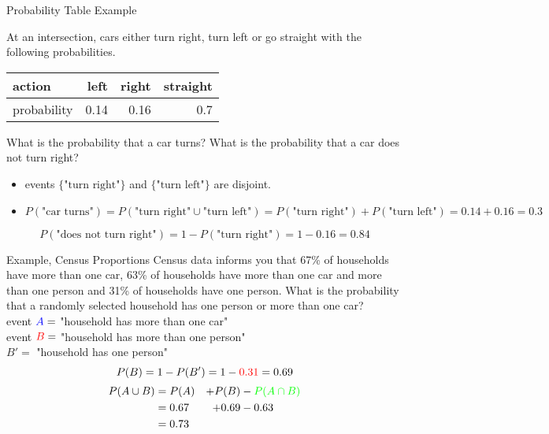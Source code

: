 \documentclass{beamer}
\newcommand{\blue}[1]{{\color{blue} #1}}
\newcommand{\red}[1]{{\color{red} #1}}
\newcommand{\grn}[1]{{\color{green} #1}}
\newcommand{\nl}[1]{\vspace{#1 em}}
\begin{document}
    \begin{frame}{Probability Table Example}
        
        At an intersection, cars either turn right, turn left or go straight with the following probabilities.
        \begin{center}
        \begin{tabular}{| l | r | r | r|}
            \hline
            action & left & right & straight \\
            \hline
            probability & 0.14 & 0.16 & 0.7 \\
            \hline
        \end{tabular}
    \end{center}
    What is the probability that a car turns? What is the probability that a car does not turn right?
    \begin{itemize}
        \item events $\{\text{"turn right"}\}$ and $\{\text{"turn left"}\}$ are disjoint.
        \item $P(\text{"car turns"}) = P(\text{"turn right"} \cup \text{"turn left"}) = P(\text{"turn right"}) + P(\text{"turn left"}) = 0.14 + 0.16 = 0.3$
    \end{itemize}
    \[P(\text{"does not turn right"}) = 1 -P(\text{"turn right"}) = 1 - 0.16 = 0.84\]

    \end{frame}

    \begin{frame}{Example, Census Proportions}
        Census data informs you that \blue{67\%} of households have more than one car, \grn{63\%} of households have more than one car and more than one person and \red{31\%} of households have one person. What is the probability that a randomly selected household has one person or more than one car?\\
        \nl{0.5}
        event $\blue{A} =$ "household has more than one car"\\
        \nl{0.5}
        event $\red{B} =$ "household has more than one person"\\
        \nl{0.5}
        $B' =$ "household has one person"\\
        \[P(B) = 1 - P(B') = 1 - \red{0.31} = 0.69\]
        \begin{alignat*}{3}
            P(A \cup B)  & = P(A) &+ P(B) &- \grn{P(A\cap B)}\\
                &= 0.67 &+ 0.69 &- 0.63\\
                & = 0.73
        \end{alignat*}
    \end{frame}
\end{document}
